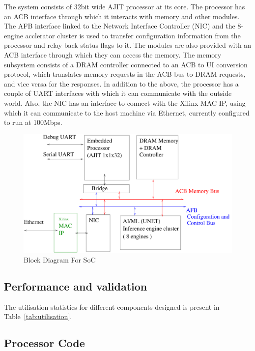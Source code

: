 \documentclass[a4paper,12pt, final]{report}
\begin{document}
The system consists of 32bit wide AJIT processor at its core. The processor has an ACB interface through which it interacts with memory and other modules. The AFB interface linked to the Network Interface Controller (NIC) and the 8-engine acclerator cluster is used to transfer configuration information from the processor and relay back status flags to it. The modules are also provided with an ACB interface through which they can access the memory. The memory subsystem consists of a DRAM controller connected to an ACB to UI conversion protocol, which translates memory requests in the ACB bus to DRAM requests, and vice versa for the responses. In addition to the above, the processor has a couple of UART interfaces with which it can communicate with the outside world. Also, the NIC has an interface to connect with the Xilinx MAC IP, using which it can communicate to the host machine via Ethernet, currently configured to run at 100Mbps. 
\\
\begin{figure}[h!]
    \centering
    \includegraphics[width=\textwidth]{BlockDiagram.pdf}
	\caption{Block Diagram For SoC}
    \label{fig:SOC}
\end{figure}

\subsection{Performance and validation}

The utilisation statistics for different components designed is present in Table~\ref{tab:utilisation}.

\subsection{Processor Code}
\end{document}
